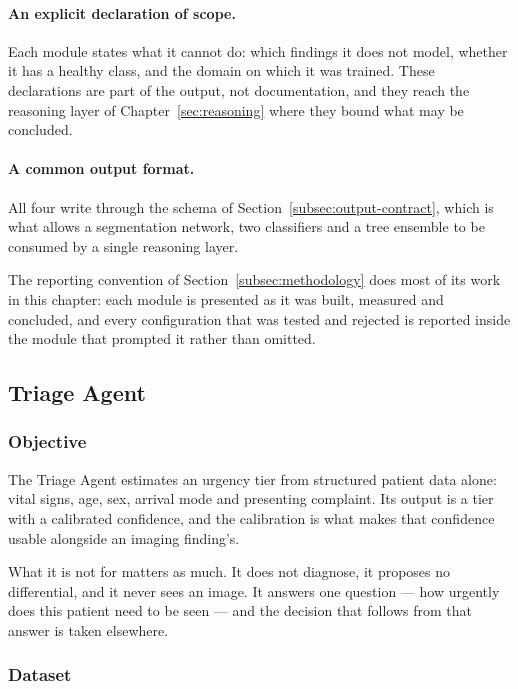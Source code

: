 \paragraph{An explicit declaration of scope.} Each module states what it cannot do: which
findings it does not model, whether it has a healthy class, and the domain on which it was
trained. These declarations are part of the output, not documentation, and they reach the
reasoning layer of Chapter~\ref{sec:reasoning} where they bound what may be concluded.

\paragraph{A common output format.} All four write through the schema of
Section~\ref{subsec:output-contract}, which is what allows a segmentation network, two
classifiers and a tree ensemble to be consumed by a single reasoning layer.

The reporting convention of Section~\ref{subsec:methodology} does most of its work in this
chapter: each module is presented as it was built, measured and concluded, and every
configuration that was tested and rejected is reported inside the module that prompted it
rather than omitted.

\subsection{Triage Agent}
\label{subsec:triage-agent}

\subsubsection{Objective}

The Triage Agent estimates an urgency tier from structured patient data alone: vital signs,
age, sex, arrival mode and presenting complaint. Its output is a tier with a calibrated
confidence, and the calibration is what makes that confidence usable alongside an imaging
finding's.

What it is not for matters as much. It does not diagnose, it proposes no differential, and it
never sees an image. It answers one question --- how urgently does this patient need to be
seen --- and the decision that follows from that answer is taken elsewhere.

\subsubsection{Dataset}

